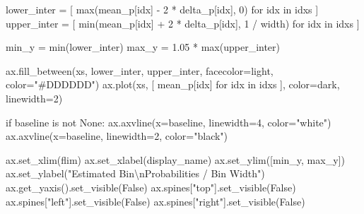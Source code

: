 \documentclass[
  letterpaper,
  DIV=11,
  numbers=noendperiod]{scrartcl}
\newenvironment{Shaded}{\begin{snugshade}}{\end{snugshade}}
\newcommand{\BuiltInTok}[1]{\textcolor[rgb]{0.00,0.23,0.31}{#1}}
\newcommand{\CharTok}[1]{\textcolor[rgb]{0.13,0.47,0.30}{#1}}
\newcommand{\ControlFlowTok}[1]{\textcolor[rgb]{0.00,0.23,0.31}{#1}}
\newcommand{\DecValTok}[1]{\textcolor[rgb]{0.68,0.00,0.00}{#1}}
\newcommand{\FloatTok}[1]{\textcolor[rgb]{0.68,0.00,0.00}{#1}}
\newcommand{\KeywordTok}[1]{\textcolor[rgb]{0.00,0.23,0.31}{#1}}
\newcommand{\NormalTok}[1]{\textcolor[rgb]{0.00,0.23,0.31}{#1}}
\newcommand{\OperatorTok}[1]{\textcolor[rgb]{0.37,0.37,0.37}{#1}}
\newcommand{\StringTok}[1]{\textcolor[rgb]{0.13,0.47,0.30}{#1}}
\newcommand{\VariableTok}[1]{\textcolor[rgb]{0.07,0.07,0.07}{#1}}
\begin{document}
\begin{Shaded}
\begin{Highlighting}[]
\NormalTok{  lower\_inter }\OperatorTok{=}\NormalTok{ [ }\BuiltInTok{max}\NormalTok{(mean\_p[idx] }\OperatorTok{{-}} \DecValTok{2} \OperatorTok{*}\NormalTok{ delta\_p[idx], }\DecValTok{0}\NormalTok{)}
                  \ControlFlowTok{for}\NormalTok{ idx }\KeywordTok{in}\NormalTok{ idxs ]}
\NormalTok{  upper\_inter }\OperatorTok{=}\NormalTok{ [ }\BuiltInTok{min}\NormalTok{(mean\_p[idx] }\OperatorTok{+} \DecValTok{2} \OperatorTok{*}\NormalTok{ delta\_p[idx], }\DecValTok{1} \OperatorTok{/}\NormalTok{ width) }
                  \ControlFlowTok{for}\NormalTok{ idx }\KeywordTok{in}\NormalTok{ idxs ]}
  
\NormalTok{  min\_y }\OperatorTok{=}        \BuiltInTok{min}\NormalTok{(lower\_inter)}
\NormalTok{  max\_y }\OperatorTok{=} \FloatTok{1.05} \OperatorTok{*} \BuiltInTok{max}\NormalTok{(upper\_inter)}
  
\NormalTok{  ax.fill\_between(xs, lower\_inter, upper\_inter,}
\NormalTok{                    facecolor}\OperatorTok{=}\NormalTok{light, color}\OperatorTok{=}\StringTok{"\#DDDDDD"}\NormalTok{)}
\NormalTok{  ax.plot(xs, [ mean\_p[idx] }\ControlFlowTok{for}\NormalTok{ idx }\KeywordTok{in}\NormalTok{ idxs ], color}\OperatorTok{=}\NormalTok{dark, linewidth}\OperatorTok{=}\DecValTok{2}\NormalTok{)}
  
  \ControlFlowTok{if}\NormalTok{ baseline }\KeywordTok{is} \KeywordTok{not} \VariableTok{None}\NormalTok{:}
\NormalTok{    ax.axvline(x}\OperatorTok{=}\NormalTok{baseline, linewidth}\OperatorTok{=}\DecValTok{4}\NormalTok{, color}\OperatorTok{=}\StringTok{"white"}\NormalTok{)}
\NormalTok{    ax.axvline(x}\OperatorTok{=}\NormalTok{baseline, linewidth}\OperatorTok{=}\DecValTok{2}\NormalTok{, color}\OperatorTok{=}\StringTok{"black"}\NormalTok{)}

\NormalTok{  ax.set\_xlim(flim)}
\NormalTok{  ax.set\_xlabel(display\_name)}
\NormalTok{  ax.set\_ylim([min\_y, max\_y])}
\NormalTok{  ax.set\_ylabel(}\StringTok{"Estimated Bin}\CharTok{\textbackslash{}n}\StringTok{Probabilities / Bin Width"}\NormalTok{)}
\NormalTok{  ax.get\_yaxis().set\_visible(}\VariableTok{False}\NormalTok{)}
\NormalTok{  ax.spines[}\StringTok{"top"}\NormalTok{].set\_visible(}\VariableTok{False}\NormalTok{)}
\NormalTok{  ax.spines[}\StringTok{"left"}\NormalTok{].set\_visible(}\VariableTok{False}\NormalTok{)}
\NormalTok{  ax.spines[}\StringTok{"right"}\NormalTok{].set\_visible(}\VariableTok{False}\NormalTok{)}
\end{Highlighting}
\end{Shaded}
\end{document}
